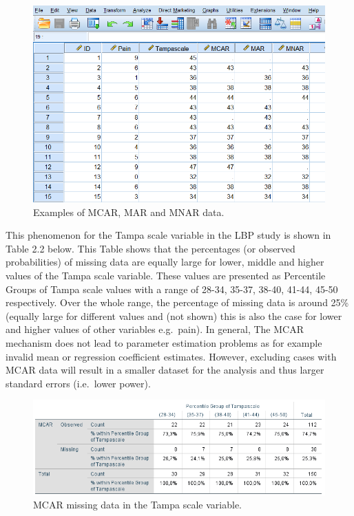 \documentclass[]{book}
\begin{document}
\begin{figure}

{\centering \includegraphics[width=0.9\linewidth]{images/fig2.7} 

}

\caption{Examples of MCAR, MAR and MNAR data.}\label{fig:fig33}
\end{figure}

This phenomenon for the Tampa scale variable in the LBP study is shown
in Table 2.2 below. This Table shows that the percentages (or observed
probabilities) of missing data are equally large for lower, middle and
higher values of the Tampa scale variable. These values are presented as
Percentile Groups of Tampa scale values with a range of 28-34, 35-37,
38-40, 41-44, 45-50 respectively. Over the whole range, the percentage
of missing data is around 25\% (equally large for different values and
(not shown) this is also the case for lower and higher values of other
variables e.g.~pain). In general, The MCAR mechanism does not lead to
parameter estimation problems as for example invalid mean or regression
coefficient estimates. However, excluding cases with MCAR data will
result in a smaller dataset for the analysis and thus larger standard
errors (i.e.~lower power).

\begin{figure}

{\centering \includegraphics[width=0.9\linewidth]{images/tab2.2} 

}

\caption{MCAR missing data in the Tampa scale variable.}\label{fig:tab2}
\end{figure}
\end{document}
